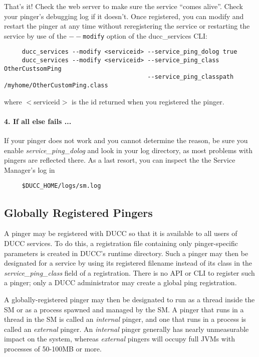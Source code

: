       That's it!  Check the web server to make sure the service ``comes alive''.  Check your pinger's
      debugging log if it doesn't.  Once registered, you can modify and restart the pinger at any time without
      reregistering the service or restarting the service by use of the {\tt $--$modify} option of the
      ducc\_services CLI:
\begin{verbatim}
     ducc_services --modify <serviceid> --service_ping_dolog true
     ducc_services --modify <serviceid> --service_ping_class OtherCustsomPing
                                        --service_ping_classpath /myhome/OtherCustomPing.class

\end{verbatim}
     where $<$serviceid$>$ is the id returned when you registered the pinger.

     \paragraph{4. If all else fails ...}
     If your pinger does not work and you cannot determine the reason, be sure you enable {\em service\_ping\_dolog} and
     look in your log directory, as most problems with pingers are reflected there.  As a last resort, you can
     inspect the the Service Manager's log in
\begin{verbatim}
     $DUCC_HOME/logs/sm.log
\end{verbatim}
     
    \subsection{Globally Registered Pingers}
    \label{subsec:services.pingers}

    A pinger may be registered with DUCC so that it is available to all users of DUCC services.  To do 
    this, a registration file containing only pinger-specific parameters is created in DUCC's runtime
    directory.   Such a pinger may then be designated for a service by using its registered filename
    instead of its class in the {\em service\_ping\_class} field of a registration.  There is no API or
    CLI to register such a pinger; only a DUCC administrator may create a global ping registration.

    A globally-registered pinger may then be designated to run as a thread inside the SM or as a
    process spawned and managed by the SM. A pinger that runs in a thread in the SM is
    called an {\em internal} pinger, and one that runs in a process is called an {\em external}
    pinger.  An {\em internal} pinger generally has nearly unmeasurable impact on the system,
    whereas {\em external} pingers will occupy full JVMs with processes of 50-100MB or more.
    

